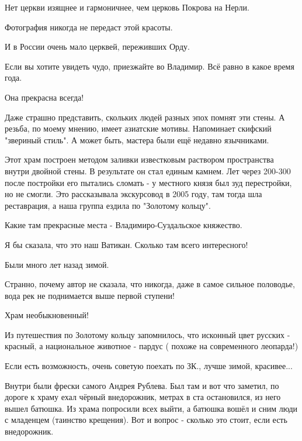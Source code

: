 \begin{itemize}

Нет церкви изящнее и гармоничнее, чем церковь Покрова на Нерли.

Фотография никогда не передаст этой красоты.

И в России очень мало церквей, переживших Орду.

Если вы хотите увидеть чудо, приезжайте во Владимир. Всё равно в какое время
года.

Она прекрасна всегда!


Даже страшно представить, скольких людей разных эпох помнят эти стены. А
резьба, по моему мнению, имеет азиатские мотивы. Напоминает
скифский "звериный стиль". А может быть, мастера были ещё
недавно язычниками.


Этот храм построен методом заливки известковым раствором пространства внутри
двойной стены. В результате он стал единым камнем. Лет через 200-300 после
постройки его пытались сломать - у местного князя был зуд перестройки, но не
смогли. Это рассказывала экскурсовод в 2005 году, там тогда шла реставрация, а
наша группа ездила по "Золотому кольцу".


Какие там прекрасные места - Владимиро-Суздальское княжество.

Я бы сказала, что это наш Ватикан. Сколько там всего интересного!


Были много лет назад зимой.

Странно, почему автор не сказала, что никогда, даже в самое сильное половодье,
вода рек не поднимается выше первой ступени!

Храм необыкновенный!

Из путешествия по Золотому кольцу запомнилось, что исконный цвет русских -
красный, а национальное животное - пардус ( похоже на современного леопарда!)

Если есть возможность, очень советую поехать по ЗК., лучше зимой, красивее...


Внутри были фрески самого Андрея Рублева. Был там и вот что заметил, по дороге
к храму ехал чёрный внедорожник, метрах в ста остановился, из него вышел
батюшка. Из храма попросили всех выйти, а батюшка вошёл и сним люди с младенцем
(таинство крещения). Вот и вопрос - сколько это стоит, если есть внедорожник.


\end{itemize}

